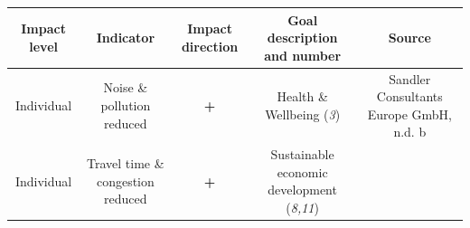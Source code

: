 \documentclass[
]{book}
\begin{document}
\begin{longtable}[]{@{}ccccc@{}}
\toprule
\begin{minipage}[b]{0.17\columnwidth}\centering
Impact level\strut
\end{minipage} & \begin{minipage}[b]{0.16\columnwidth}\centering
Indicator\strut
\end{minipage} & \begin{minipage}[b]{0.17\columnwidth}\centering
Impact direction\strut
\end{minipage} & \begin{minipage}[b]{0.17\columnwidth}\centering
Goal description and number\strut
\end{minipage} & \begin{minipage}[b]{0.17\columnwidth}\centering
Source\strut
\end{minipage}\tabularnewline
\midrule
\endhead
\begin{minipage}[t]{0.17\columnwidth}\centering
Individual\strut
\end{minipage} & \begin{minipage}[t]{0.16\columnwidth}\centering
Noise \& pollution reduced\strut
\end{minipage} & \begin{minipage}[t]{0.17\columnwidth}\centering
\textbf{+}\strut
\end{minipage} & \begin{minipage}[t]{0.17\columnwidth}\centering
Health \& Wellbeing (\emph{3})\strut
\end{minipage} & \begin{minipage}[t]{0.17\columnwidth}\centering
Sandler Consultants Europe GmbH, n.d. b\strut
\end{minipage}\tabularnewline
\begin{minipage}[t]{0.17\columnwidth}\centering
Individual\strut
\end{minipage} & \begin{minipage}[t]{0.16\columnwidth}\centering
Travel time \& congestion reduced\strut
\end{minipage} & \begin{minipage}[t]{0.17\columnwidth}\centering
\textbf{+}\strut
\end{minipage} & \begin{minipage}[t]{0.17\columnwidth}\centering
Sustainable economic development (\emph{8,11})\strut
\end{minipage} & \begin{minipage}[t]{0.17\columnwidth}\centering

\end{minipage}
\end{longtable}
\end{document}
